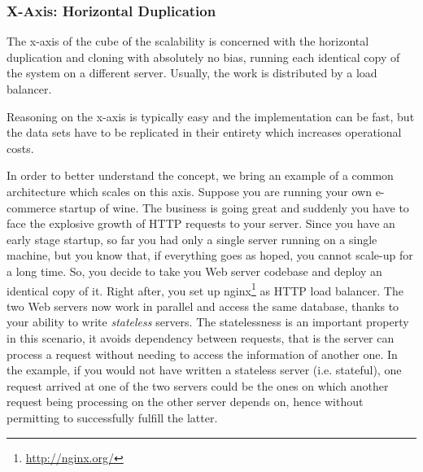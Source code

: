 \subsubsection{X-Axis: Horizontal Duplication}

The x-axis of the cube of the scalability is concerned with the horizontal
duplication and cloning with absolutely no bias, running each identical copy of
the system on a different server. Usually, the work is distributed by a load
balancer.

Reasoning on the x-axis is typically easy and the implementation can be fast,
but the data sets have to be replicated in their entirety which increases
operational costs.

In order to better understand the concept, we bring an example of a common
architecture which scales on this axis. Suppose you are running your own
e-commerce startup of wine. The business is going great and suddenly you have to
face the explosive growth of HTTP requests to your server. Since you have an
early stage startup, so far you had only a single server running on a single
machine, but you know that, if everything goes as hoped, you cannot scale-up for
a long time. So, you decide to take you Web server codebase and deploy an
identical copy of it. Right after, you set up
nginx\footnote{\url{http://nginx.org/}} as HTTP load balancer. The two Web
servers now work in parallel and access the same database, thanks to your
ability to write \emph{stateless} servers. The statelessness is an important
property in this scenario, it avoids dependency between requests, that is
the server can process a request without needing to access the information of
another one. In the example, if you would not have written a stateless server
(i.e. stateful), one request arrived at one of the two servers could be the ones
on which another request being processing on the other server depends on, hence
without permitting to successfully fulfill the latter.

